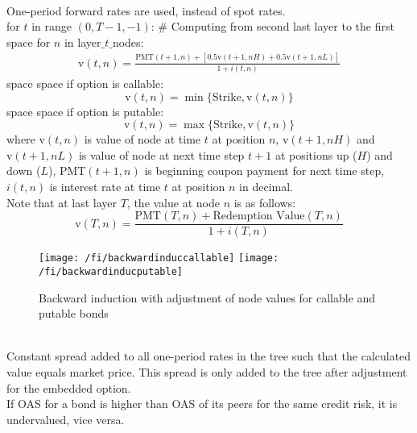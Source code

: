 \begin{method} \\
One-period forward rates are used, instead of spot rates.\\
for $t$ in range $(0, T-1, -1)$: \# Computing from second last layer to the first \\
{\color{white}space} for $n$ in layer$\_t\_$nodes:
\begin{align}
\text{v}(t,n) = \frac{\text{PMT}(t+1,n)+ [0.5 \text{v}(t+1, nH) + 0.5 \text{v}(t+1, nL)]}{1 + i(t, n)} \nonumber
\end{align}
{\color{white}space} {\color{white}space} if option is callable:
\begin{equation}
\text{v}(t,n) = \min \{\text{Strike}, \text{v}(t,n) \} \nonumber
\end{equation}
{\color{white}space} {\color{white}space} if option is putable:
\begin{equation}
\text{v}(t,n) = \max \{\text{Strike}, \text{v}(t,n) \} \nonumber
\end{equation}
where $\text{v}(t,n)$ is value of node at time $t$ at position $n$, $\text{v}(t+1,nH)$ and $\text{v}(t+1,nL)$ is value of node at next time step $t+1$ at positions up ($H$) and down ($L$), $\text{PMT}(t+1,n)$ is beginning coupon payment for next time step, $i(t,n)$ is interest rate at time $t$ at position $n$ in decimal. \\
Note that at last layer $T$, the value at node $n$ is as follows:
\begin{equation}
\text{v}(T, n) = \frac{\text{PMT}(T,n) + \text{Redemption Value}(T,n)}{1 + i(T, n)} \nonumber
\end{equation}
\end{method}

\begin{figure}[H]
\centering
\texttt{[image: /fi/backwardinduccallable]}
\texttt{[image: /fi/backwardinducputable]}
\caption{Backward induction with adjustment of node values for callable and putable bonds}
\end{figure}

\begin{remark} \\
Constant spread added to all one-period rates in the tree such that the calculated value equals market price. This spread is only added to the tree after adjustment for the embedded option.\\
If OAS for a bond is higher than OAS of its peers for the same credit risk, it is undervalued, vice versa.
\end{remark}

